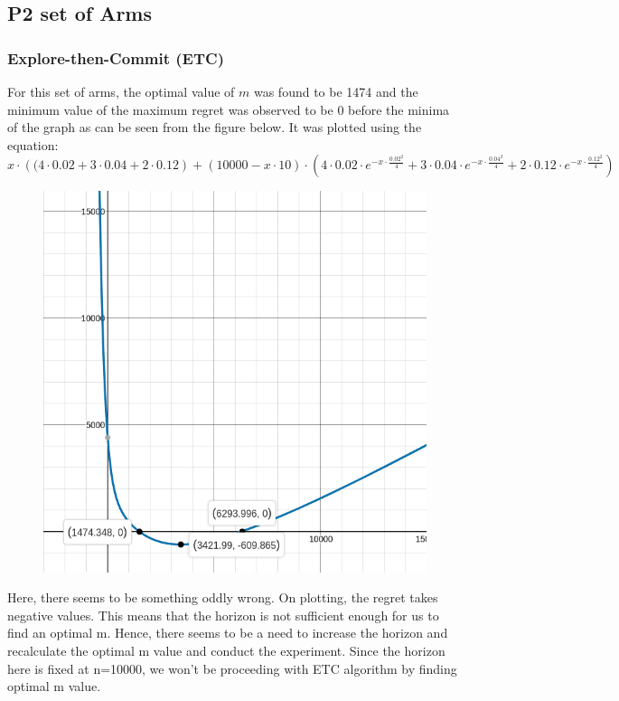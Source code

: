 \documentclass[12pt]{report}
\begin{document}
	\subsection{P2 set of Arms}
		\subsubsection{Explore-then-Commit (ETC)}
			For this set of arms, the optimal value of $m$ was found to be 1474 and the minimum value of the maximum regret was observed to be 0 before the minima of the graph as can be seen from the figure below. It was plotted using the equation:
				$$x\cdot\left((4\cdot0.02+3\cdot0.04+2\cdot0.12\right)+\left(10000-x\cdot10\right)\cdot\left(4\cdot0.02\cdot e^{-x\cdot\frac{0.02^2}{4}}+3\cdot0.04\cdot e^{-x\cdot\frac{0.04^2}{4}}+2\cdot0.12\cdot e^{-x\cdot\frac{0.12^2}{4}}\right)$$
			
			\begin{figure}[H]
				\includegraphics[scale=0.5]{Figures/m_P2.png}
			\end{figure}
			
			\noindent Here, there seems to be something oddly wrong. On plotting, the regret takes negative values. This means that the horizon is not sufficient enough for us to find an optimal m. Hence, there seems to be a need to increase the horizon and recalculate the optimal m value and conduct the experiment. Since the horizon here is fixed at n=10000, we won't be proceeding with ETC algorithm by finding optimal m value.
			
\end{document}
